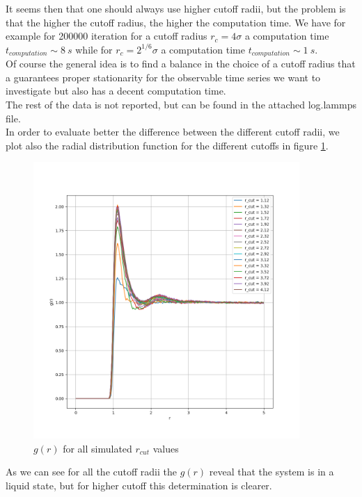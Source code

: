 It seems then that one should always use higher cutoff radii, but the problem is that the higher the cutoff radius, the higher the computation time.
We have for example for 200000 iteration for a cutoff radius $r_c = 4\sigma$ a computation time $t_{computation} \sim 8\ s $ while for $r_c = 2^{1/6}\sigma$ a computation time $t_{computation} \sim 1\ s $.\\
Of course the general idea is to find a balance in the choice of a cutoff radius that a guarantees proper stationarity for the observable time series we want to investigate but also has a decent computation time. \\
The rest of the data is not reported, but can be found in the attached log.lammps file. \\
In order to evaluate better the difference between the different cutoff radii, we plot also the radial distribution function for the different cutoffs in figure \ref{ex10:rdf_comparison}. \\

\begin{figure}[H]
    \centering
    \includegraphics[width=0.9\textwidth]{FIG/ex10/rdf_comparison.png}
    \caption{$g(r)$ for all simulated $r_{cut}$ values}
    \label{ex10:rdf_comparison}
\end{figure}

As we can see for all the cutoff radii the $g(r)$ reveal that the system is in a liquid state, but for higher cutoff this determination is clearer.

